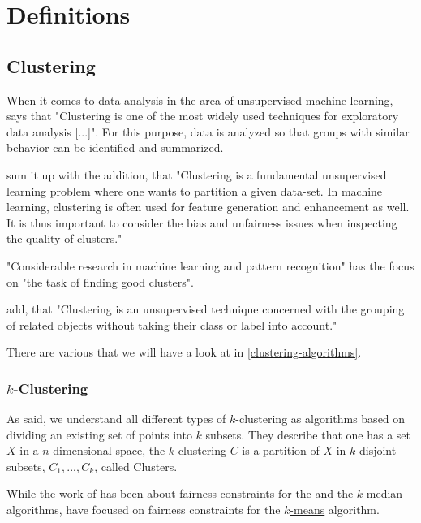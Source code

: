 \section{Definitions}


\subsection{Clustering}

When it comes to data analysis in the area of unsupervised machine learning, \textcite[1]{VonLuxburg2007} says that "Clustering is one of the most widely used techniques for exploratory data analysis [...]". For this purpose, data is analyzed so that groups with similar behavior can be identified and summarized.

\textcite[]{Bera2019} sum it up with the addition, that "Clustering is a fundamental unsupervised learning problem where one wants to partition a given data-set. In machine learning, clustering is often used for feature generation and enhancement as well. It is thus important to consider the bias and unfairness issues when inspecting the quality of clusters." \autocite[1]{Bera2019}

"Considerable research in machine learning and pattern recognition" has the focus on "the task of finding good clusters". \autocite[1]{Ng2001}

\textcite[1]{Nascimento2011} add, that "Clustering is an unsupervised technique concerned with the grouping of related objects without taking their class or label into account."

There are various  that we will have a look at in \autoref{clustering-algorithms}.

\subsubsection{$k$-Clustering}

As  \textcite[]{Chierichetti2018} said, we understand all different types of $k$-clustering as algorithms based on dividing an existing set of points into $k$ subsets. They describe that one has a set $X$ in a $n$-dimensional space, the $k$-clustering $C$ is a partition of $X$ in $k$ disjoint subsets, $C_{1},...,C_{k}$, called Clusters. \autocite[3]{Chierichetti2018}

While the work of \textcite[]{Chierichetti2018} has been about fairness constraints for the  and the $k$-median algorithms, \textcite[]{Schmidt2018} have focused on fairness constraints for the \hyperref[k-means]{$k$-means} algorithm.

